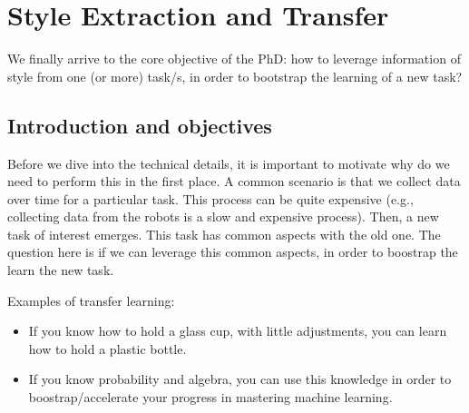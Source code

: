\chapter{Style Extraction and Transfer}
\minitoc%

\par We finally arrive to the core objective of the PhD: how to leverage information of style from one (or more) \Gls{task}/s, in order to bootstrap the learning of a new task?


\section{Introduction and objectives}

  \par Before we dive into the technical details, it is important to motivate why do we need to perform this in the first place. A common scenario is that we collect data over time for a particular task. This process can be quite expensive (e.g., collecting data from the robots is a slow and expensive process). Then, a new task of interest emerges. This task has common aspects with the old one. The question here is if we can leverage this common aspects, in order to boostrap the learn the new task.


  \par Examples of transfer learning:
  \begin{itemize}
      \item If you know how to hold a glass cup, with little adjustments, you can learn how to hold a plastic bottle.
      \item If you know probability and algebra, you can use this knowledge in order to boostrap/accelerate your progress in mastering machine learning.
  \end{itemize}

